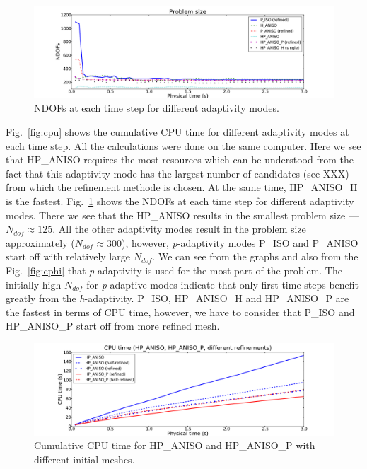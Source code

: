 \begin{figure}
  \begin{centering}
  \includegraphics[width=\columnwidth]{dof}
  \caption{\label{fig:dof} NDOFs at each time step for different adaptivity modes.}
  \end{centering}
\end{figure}

Fig.~\ref{fig:cpu} shows the cumulative CPU time for different adaptivity
modes at each time step. All the calculations were done on the same computer.
Here we see that HP\_ANISO requires the most
resources which can be understood from the fact that this adaptivity mode has the largest number of 
candidates (see XXX) from which the refinement methode is chosen.
At the same time, HP\_ANISO\_H is the fastest.
Fig.~\ref{fig:dof} shows the NDOFs at each time step for different adaptivity modes.
There we see that the HP\_ANISO results in the smallest problem size --- $N_{dof} \approx 125$. 
All the other adaptivity modes result in  the problem size approximately ($N_{dof} \approx 300$), 
however, \emph{p}-adaptivity modes P\_ISO and P\_ANISO start off with relatively large $N_{dof}$.
We can see from the graphs and also from the Fig.~\ref{fig:cphi} that
\emph{p}-adaptivity is used for the most part of the problem. The initially high
$N_{dof}$ for \emph{p}-adaptive modes indicate that only first time steps benefit
greatly from the \emph{h}-adaptivity. P\_ISO, HP\_ANISO\_H
and HP\_ANISO\_P are the fastest in terms of CPU time, however, we have to consider
that P\_ISO  and HP\_ANISO\_P start off from more refined mesh.

\begin{figure}
  \begin{centering}
  \includegraphics[width=\columnwidth]{refined_cpu}
  \caption{\label{fig:refined-cpu} Cumulative CPU time for HP\_ANISO and HP\_ANISO\_P
  with different initial meshes.}
  \end{centering}
\end{figure}

